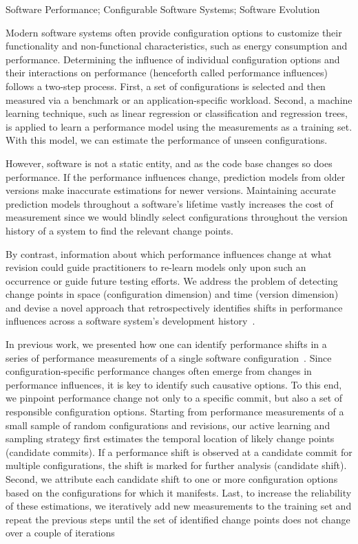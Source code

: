 \documentclass[utf8,biblatex]{lni}
\begin{document}
\begin{keywords}
Software Performance; 
Configurable Software Systems; 
Software Evolution
\end{keywords}

Modern software systems often provide configuration options to customize their functionality and non-functional characteristics, such as energy consumption and performance. Determining the influence of individual configuration options and their interactions on performance (henceforth called performance influences) follows a two-step process. First, a set of configurations is selected and then measured via a benchmark or an application-specific workload. Second, a machine learning technique, such as linear regression or classification and regression trees, is applied to learn a performance model using the measurements as a training set. With this model, we can estimate the performance of unseen configurations.%

However, software is not a static entity, and as the code base changes so does performance. If the performance influences change, prediction models from older versions make inaccurate estimations for newer versions. Maintaining accurate prediction models throughout a software’s lifetime vastly increases the cost of measurement since we would blindly select configurations throughout the version history of a system to find the relevant change points.

By contrast, information about which performance influences change at what revision could guide practitioners to re-learn models only upon such an occurrence or guide future testing efforts. We address the problem of detecting change points in space (configuration dimension) and time (version dimension) and devise a novel approach that retrospectively identifies shifts in performance influences across a software system's development history~\cite{muehlbauer_identifying_2020}. 

In previous work, we presented how one can identify performance shifts in a series of performance measurements of a single software configuration~\cite{muhlbauer_accurate_2019}. Since configuration-specific performance changes often emerge from changes in performance influences, it is key to identify such causative options. To this end, we pinpoint performance change not only to a specific commit, but also a set of responsible configuration options. Starting from performance measurements of a small sample of random configurations and revisions, our active learning and sampling strategy first estimates the temporal location of likely change points (candidate commits). If a performance shift is observed at a candidate commit for multiple configurations, the shift is marked for further analysis (candidate shift). Second, we attribute each candidate shift to one or more configuration options based on the configurations for which it manifests. Last, to increase the reliability of these estimations, we iteratively add new measurements to the training set and repeat the previous steps until the set of identified change points does not change over a couple of iterations
\end{document}
